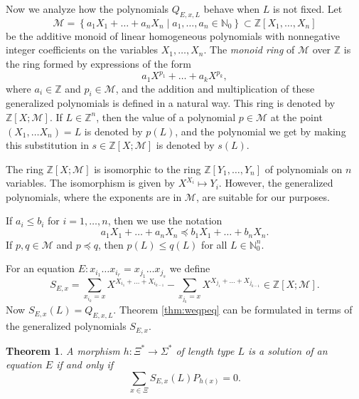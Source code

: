\documentclass[submission]{eptcs}
\newtheorem{theorem}{Theorem}[section]
\theoremstyle{definition}
\newcommand{\Z}{\mathbb Z}
\newcommand{\No}{\mathbb N_0}
\newcommand{\set}[2]{ \left\{ #1 \mid #2 \right\} }
\newcommand{\px}[1]{ P_{#1} }
\newcommand{\qx}[3]{ Q_{#1,#2,#3} }
\newcommand{\sx}[2]{ S_{#1,#2} }
\newcommand{\lhp}{\mathcal M}
\begin{document}
Now we analyze how the polynomials
\begin{math}
    \qx{E}{x}{L}
\end{math}
behave when $L$ is not fixed. Let
\begin{equation*}
    \lhp = \set{a_1 X_1 + \dots + a_n X_n}{a_1, \dots, a_n \in \No}
    \subset \Z[X_1, \dots, X_n]
\end{equation*}
be the additive monoid of linear homogeneous polynomials with
nonnegative integer coefficients on the variables $X_1, \dots, X_n$.
The \emph{monoid ring} of $\lhp$ over $\Z$ is the ring formed by
expressions of the form
\begin{equation*}
    a_1 X^{p_1} + \dots + a_k X^{p_k},
\end{equation*}
where $a_i \in \Z$ and $p_i \in \lhp$, and the addition and
multiplication of these generalized polynomials is defined in a
natural way. This ring is denoted by $\Z[X;\lhp]$. If $L \in \Z^n$,
then the value of a polynomial $p \in \lhp$ at the point $(X_1,
\dots X_n) = L$ is denoted by $p(L)$, and the polynomial we get by
making this substitution in $s \in \Z[X;\lhp]$ is denoted by $s(L)$.

The ring $\Z[X;\lhp]$ is isomorphic to the ring $\Z[Y_1, \dots,
Y_n]$ of polynomials on $n$ variables. The isomorphism is given by
$X^{X_i} \mapsto Y_i$. However, the generalized polynomials, where
the exponents are in $\lhp$, are suitable for our purposes.

If $a_i \leq b_i$ for $i = 1, \dots, n$, then we use the notation
\begin{equation*}
    a_1 X_1 + \dots + a_n X_n \preceq b_1 X_1 + \dots + b_n X_n.
\end{equation*}
If $p, q \in \lhp$ and $p \preceq q$, then $p(L) \leq q(L)$ for all
$L \in \No^n$.

For an equation $E: x_{i_1} \dots x_{i_r} = x_{j_1} \dots x_{j_s}$
we define
\begin{equation*}
    \sx{E}{x} = \sum_{x_{i_k} = x} X^{X_{i_1} + \dots + X_{i_{k-1}}}
        - \sum_{x_{j_k} = x} X^{X_{j_1} + \dots + X_{j_{k-1}}}
    \in \Z[X;\lhp].
\end{equation*}
Now $\sx{E}{x}(L) = \qx{E}{x}{L}$. Theorem \ref{thm:weqpeq} can be
formulated in terms of the generalized polynomials $\sx{E}{x}$.

\begin{theorem}
A morphism $h: \Xi^* \to \Sigma^*$ of length type $L$ is a solution
of an equation $E$ if and only if
\begin{equation*}
    \sum_{x \in \Xi} \sx{E}{x}(L) \px{h(x)} = 0.
\end{equation*}
\end{theorem}
\end{document}
